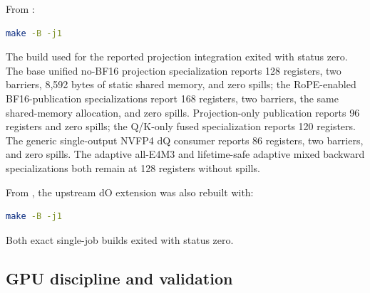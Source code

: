 From :
\begin{lstlisting}[language=bash]
make -B -j1
\end{lstlisting}
The build used for the reported projection integration exited with status
zero.  The base unified no-BF16 projection specialization reports 128
registers, two barriers, 8,592 bytes of static shared memory, and zero spills;
the RoPE-enabled BF16-publication specializations report 168 registers, two
barriers, the same shared-memory allocation, and zero spills.  Projection-only
publication reports 96 registers and zero spills; the Q/K-only fused
specialization reports 120 registers.  The generic single-output NVFP4 dQ
consumer reports 86 registers, two barriers, and zero spills.  The adaptive
all-E4M3 and lifetime-safe adaptive mixed backward specializations both remain
at 128 registers without spills.

From , the upstream dO extension was also
rebuilt with:
\begin{lstlisting}[language=bash]
make -B -j1
\end{lstlisting}
Both exact single-job builds exited with status zero.

\subsection{GPU discipline and validation}

